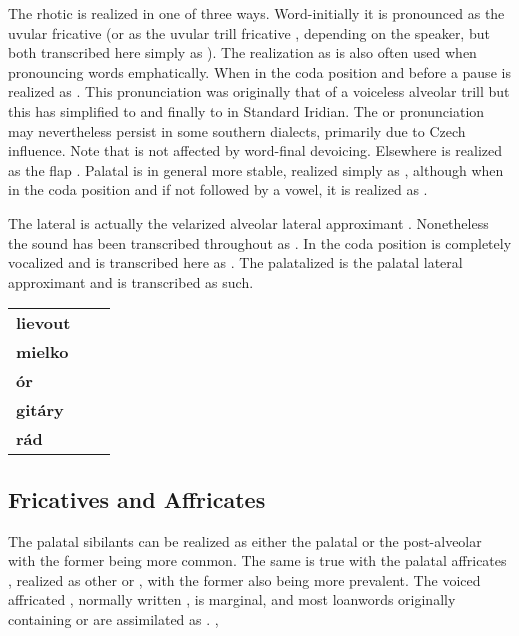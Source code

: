The rhotic  is realized in one of three ways. Word-initially it is pronounced as the uvular fricative \nt{\textinvscr} (or as the uvular trill fricative \nt{\textraising{\textscr}}, depending on the speaker, but both transcribed here simply as \nt{\rrr}). The realization as \nt{\rrr} is also often used when pronouncing words emphatically. When in the coda position and before a pause  is realized as \bt{\textctz}. This pronunciation was originally that of a voiceless alveolar trill  but this has simplified to  and finally to \nt{\textctz} in Standard Iridian. The  or  pronunciation may nevertheless persist in some southern dialects, primarily due to Czech influence. Note that \nt{\textctz} is not affected by word-final devoicing. Elsewhere  is realized as the flap . Palatal  is in general more stable, realized simply as , although when in the coda position and if not followed by a vowel, it is realized as \nt{\textctz}.

The lateral  is actually the velarized alveolar lateral approximant \nt{\textltilde}. Nonetheless the sound has been transcribed throughout as . In the coda position  is completely vocalized and is transcribed here as . The palatalized  is the palatal lateral approximant  and is transcribed as such.

\ex
	{\small
	\begin{tabularx}{0.8\textwidth}{>{\bfseries}YYY}
		lievout		&  	& \\
		mielko	 	& 		& \\
		\'or		& 				& \\
		git\'ary	& 		& \\
		r\'ad		& 			& \\
	\end{tabularx}}
\xe

\subsection{Fricatives and Affricates}
The palatal sibilants  can be realized as either the palatal  or the post-alveolar  with the former being more common. The same is true with the palatal affricates , realized as other  or , with the former also being more prevalent. The voiced affricated , normally written , is marginal, and most loanwords originally containing  or  are assimilated as \nt{\zz}.
\ex
{}, \\
\xe

